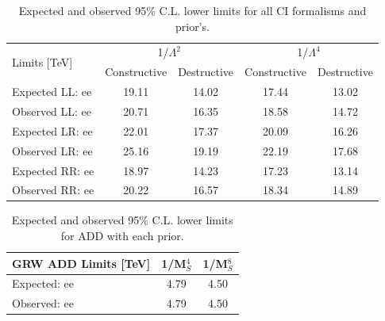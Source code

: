 


    \begin {table}[h]
        \begin{center}
        \begin{tabular}{  l | c | c | c | c  } 
            \hline
            \hline
            \multirow{2}{*}{Limits [TeV]} & \multicolumn{2}{c|}{1/$\Lambda^2$} & \multicolumn{2}{c}{1/$\Lambda^4$} \\
            \cline{2-5}
             & Constructive & Destructive & Constructive & Destructive \\
            \hline
            Expected LL: ee       & 19.11 & 14.02 & 17.44 & 13.02 \\
            Observed LL: ee       & 20.71 & 16.35 & 18.58 & 14.72 \\
            \hline
            Expected LR: ee       & 22.01 & 17.37 & 20.09 & 16.26 \\
            Observed LR: ee       & 25.16 & 19.19 & 22.19 & 17.68 \\
            \hline
            Expected RR: ee       & 18.97 & 14.23 & 17.23 & 13.14 \\
            Observed RR: ee       & 20.22 & 16.57 & 18.34 & 14.89 \\
            \hline
            \hline
        \end{tabular}
        \caption{Expected and observed 95\% C.L. lower limits for all CI formalisms and prior's.}
        \label{tab:limits_CI}
        \end{center}
    \end {table}


    \begin {table}[h]
        \begin{center}
        \begin{tabular}{ l | c | c } 
            \hline
            \hline
            GRW ADD Limits [TeV] & 1/M$_S^4$ & 1/M$_S^8$ \\
            \hline
            Expected: ee & 4.79 & 4.50 \\
            Observed: ee & 4.79 & 4.50 \\
            \hline
            \hline
        \end{tabular}
        \caption{Expected and observed 95\% C.L. lower limits for ADD with each prior.}
        \label{tab:limits_ADD}
        \end{center}
    \end {table}


